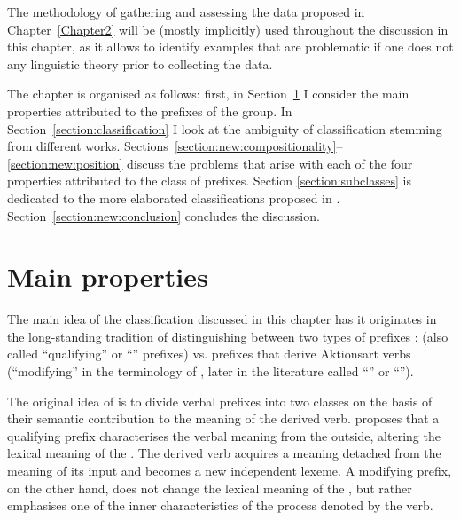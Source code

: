  The methodology of gathering and assessing the data proposed in Chapter~\ref{Chapter2} will be (mostly implicitly) used throughout the discussion in this chapter, as it allows to identify examples that are problematic if one does not  any linguistic theory prior to collecting the data.

The chapter is organised as follows: first, in Section~\ref{section:properties} I consider the main properties attributed to the prefixes of the  group. In Section~\ref{section:classification} I look at the ambiguity of classification stemming from different works. Sections~\ref{section:new:compositionality}--\ref{section:new:position} discuss the problems that arise with each of the four properties attributed to the class of  prefixes. Section \ref{section:subclasses} is dedicated to the more elaborated classifications proposed in \citet{Tatevosov:07,Tatevosov:09}. Section~\ref{section:new:conclusion} concludes the discussion.
\section{Main properties}\label{section:properties}
The main idea of the classification discussed in this chapter has it originates in the long-standing tradition of distinguishing between two types of prefixes \citep{Isachenko:60, Forsyth:70, Townsend:75}:  (also called ``qualifying'' or ``'' prefixes) vs. prefixes that derive Aktionsart verbs (``modifying'' in the terminology of \citeauthor{Isachenko:60}, later in the literature called ``'' or ``'').

The original idea of \citet[222--224]{Isachenko:60} is to divide verbal prefixes into two classes on the basis of their semantic contribution to the meaning of the derived verb. \citeauthor{Isachenko:60} proposes that a qualifying prefix characterises the verbal meaning from the outside, altering the lexical meaning of the . The derived verb acquires a meaning detached from the meaning of its input and becomes a new independent lexeme. A modifying prefix, on the other hand, does not change the lexical meaning of the , but rather emphasises one of the inner characteristics of the process denoted by the  verb.

